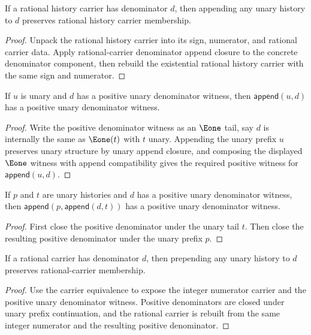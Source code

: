 \begin{theorem}
\label{thm:rat-history-carrier-append-unary-denominator-closed}
If a rational history carrier has denominator \(d\), then appending any unary history to \(d\) preserves rational history carrier membership.
\end{theorem}
\begin{proof}
Unpack the rational history carrier into its sign, numerator, and rational carrier data. Apply rational-carrier denominator append closure to the concrete denominator component, then rebuild the existential rational history carrier with the same sign and numerator.
\end{proof}

\begin{theorem}
\label{thm:rat-positive-denominator-append-unary-prefix}
If $u$ is unary and $d$ has a positive unary denominator witness, then
$\mathsf{append}(u,d)$ has a positive unary denominator witness.
\end{theorem}
\begin{proof}
Write the positive denominator witness as an $\Eone$ tail, say $d$ is
internally the same as $\Eone(t)$ with $t$ unary. Appending the unary prefix
$u$ preserves unary structure by unary append closure, and composing the
displayed $\Eone$ witness with append compatibility gives the required
positive witness for $\mathsf{append}(u,d)$.
\end{proof}

\begin{theorem}
\label{thm:rat-positive-denominator-append-unary-context}
If $p$ and $t$ are unary histories and $d$ has a positive unary denominator
witness, then $\mathsf{append}(p,\mathsf{append}(d,t))$ has a positive unary
denominator witness.
\end{theorem}
\begin{proof}
First close the positive denominator under the unary tail $t$. Then close the
resulting positive denominator under the unary prefix $p$.
\end{proof}

\begin{theorem}
\label{thm:rat-carrier-prepend-unary-denominator-closed}
If a rational carrier has denominator \(d\), then prepending any unary history
to \(d\) preserves rational-carrier membership.
\end{theorem}
\begin{proof}
Use the carrier equivalence to expose the integer numerator carrier and the
positive unary denominator witness. Positive denominators are closed under
unary prefix continuation, and the rational carrier is rebuilt from the same
integer numerator and the resulting positive denominator.
\end{proof}

